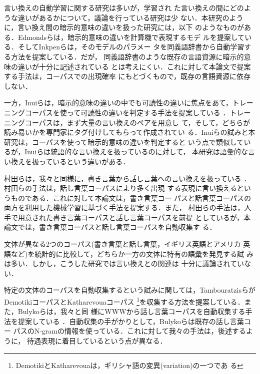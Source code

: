 \documentclass{nlp}
\begin{document}
言い換えの自動学習に関する研究は多いが\cite{Lin01,Barzilay03}，学習され
た言い換えの間にどのような違いがあるかについて，議論を行っている研究は少
ない．本研究のように，言い換え間の暗示的意味の違いを扱った研究には，以下
のようなものがある．Edmondsらは，暗示的意味の違いを計算機で表現するモデ
ルを提案している\cite{Edmonds02}．そしてInkpenらは，そのモデルのパラメー
タを同義語辞書から自動学習する方法を提案している\cite{Inkpen01}．だが，
同義語辞書のような既存の言語資源に暗示的意味の違いが十分に記述されている
とは考えにくい．これに対して本論文で提案する手法は，コーパスでの出現確率
にもとづくもので，既存の言語資源に依存しない．

一方，Inuiらは，暗示的意味の違いの中でも可読性の違いに焦点をあて，トレー
ニングコーパスを使って可読性の違いを判定する手法を提案している
\cite{Inui01}．トレーニングコーパスは，まず大量の言い換えのペアを用意し
て，そして，どちらが読み易いかを専門家にタグ付けしてもらって作成されてい
る．Inuiらの試みと本研究は，コーパスを使って暗示的意味の違いを判定すると
いう点で類似しているが，Inuiらは統語的な言い換えを扱っているのに対して，
本研究は語彙的な言い換えを扱っているという違いがある．

村田らは，我々と同様に，書き言葉から話し言葉への言い換えを扱っている
\cite{Murata01,Murata02}．村田らの手法は，話し言葉コーパスにより多く出現
する表現に言い換えるというものである．これに対して本論文は，書き言葉コー
パスと話言葉コーパスの両方を利用した機械学習に基づく手法を提案する．また，
村田らの手法は，人手で用意された書き言葉コーパスと話し言葉コーパスを前提
としているが，本論文では，書き言葉コーパスと話し言葉コーパスを自動収集す
る．

文体が異なる2つのコーパス(書き言葉と話し言葉，イギリス英語とアメリカ
英語など)を統計的に比較して，どちらか一方の文体に特有の語彙を発見する試
みは多い\cite{Kilgarriff01}．しかし，こうした研究では言い換えとの関連は
十分に議論されていない．

特定の文体のコーパスを自動収集するという試みに関しては，Tambouratzisらが
DemotikiコーパスとKatharevouaコーパス
\footnote{DemotikiとKatharevouaは，ギリシャ語の変異(variation)の一つであ
る}を収集する方法を提案している\cite{Tam00}．また，Bulykoらは，我々と同
様にWWWから話し言葉コーパスを自動収集する手法を提案している
\cite{Bulyko03}．自動収集の手がかりとして，Bulykoらは既存の話し言葉コー
パスのN-gramの情報を使っている．これに対して我々の手法は，後述するように，
待遇表現に着目しているという点が異なる．
\end{document}
